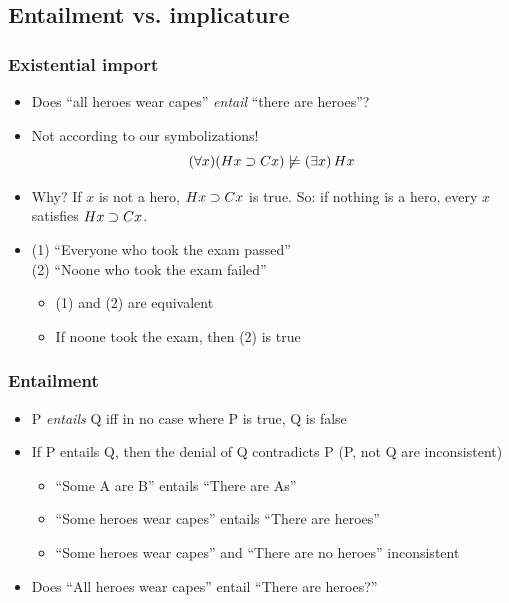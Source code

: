 \subsection{Entailment vs. implicature}

\begin{frame}
  \frametitle{Existential import}

  \begin{itemize}[<+->]
  \item Does ``all heroes wear capes'' \emph{entail} ``there are heroes''?
  \item Not according to our symbolizations!
  \[
  (\forall x)(Hx \supset Cx) \not\models (\exists x)\,Hx
  \]
  \item Why? If $x$ is not a hero, $Hx \supset Cx$ is true. So: if
  nothing is a hero, every $x$ satisfies $Hx \supset Cx$.
  \item (1) ``Everyone who took the exam passed''\\
  (2) ``Noone who took the exam failed''
  \begin{itemize}
  \item (1) and (2) are equivalent
  \item If noone took the exam, then (2) is true
  \end{itemize}\end{itemize}
  \end{frame}

  \begin{frame}
  \frametitle{Entailment}

  \begin{itemize}[<+->]
  \item P \emph{entails} Q iff in no case where P is true, Q is false
  \item If P entails Q, then the denial of Q contradicts P (P, not Q are
  inconsistent)
  \begin{itemize}[<+->]
  \item ``Some A are B'' entails ``There are As''
  \item ``Some heroes wear capes'' entails ``There are heroes''
  \item ``Some heroes wear capes'' and ``There are no heroes'' inconsistent
  \end{itemize}\item Does ``All heroes wear capes'' entail ``There are heroes?''
  \end{itemize}
  \end{frame}

